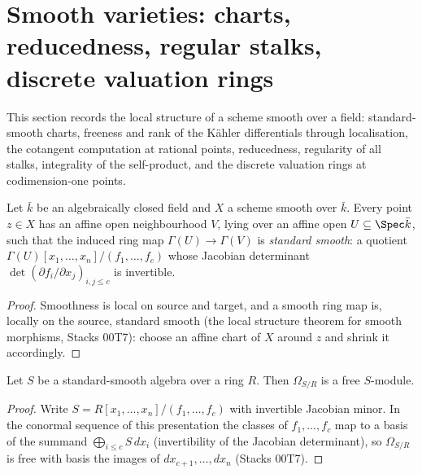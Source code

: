 \section{Smooth varieties: charts, reducedness, regular stalks,
  discrete valuation rings}
\label{sec:smooth_stalks}

This section records the local structure of a scheme smooth over a field:
standard-smooth charts, freeness and rank of the K\"ahler differentials through
localisation, the cotangent computation at rational points, reducedness,
regularity of all stalks, integrality of the self-product, and the discrete
valuation rings at codimension-one points.

\begin{theorem}
  \label{thm:smooth_chart}
  \leanok
  Let \(\bar k\) be an algebraically closed field and \(X\) a scheme smooth
  over \(\bar k\). Every point \(z \in X\) has an affine open neighbourhood
  \(V\), lying over an affine open \(U \subseteq \Spec \bar k\), such that the
  induced ring map \(\Gamma(U) \to \Gamma(V)\) is \emph{standard smooth}: a
  quotient \(\Gamma(U)[x_1, \dots, x_n]/(f_1, \dots, f_c)\) whose Jacobian
  determinant \(\det(\partial f_i/\partial x_j)_{i,j \leq c}\) is invertible.
\end{theorem}
\begin{proof}
  \leanok
  Smoothness is local on source and target, and a smooth ring map is, locally
  on the source, standard smooth (the local structure theorem for smooth
  morphisms, Stacks 00T7): choose an affine chart of \(X\) around \(z\) and
  shrink it accordingly.
\end{proof}

\begin{lemma}
  \label{lem:ss_kaehler_free}
  \leanok
  Let \(S\) be a standard-smooth algebra over a ring \(R\). Then
  \(\Omega_{S/R}\) is a free \(S\)-module.
\end{lemma}
\begin{proof}
  \leanok
  Write \(S = R[x_1, \dots, x_n]/(f_1, \dots, f_c)\) with invertible Jacobian
  minor. In the conormal sequence of this presentation the classes of
  \(f_1, \dots, f_c\) map to a basis of the summand
  \(\bigoplus_{i \leq c} S\,dx_i\) (invertibility of the Jacobian determinant),
  so \(\Omega_{S/R}\) is free with basis the images of
  \(dx_{c+1}, \dots, dx_n\) (Stacks 00T7).
\end{proof}

